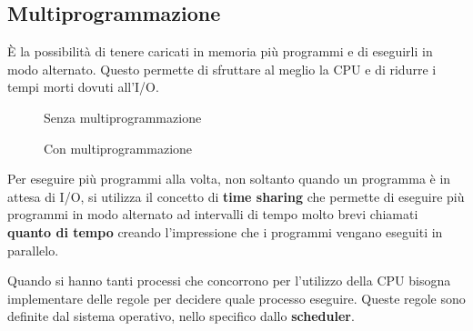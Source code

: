\documentclass[a4paper]{article}
\begin{document}
\subsection{Multiprogrammazione}
È la possibilità di tenere caricati in memoria più programmi e di eseguirli in modo
alternato. Questo permette di sfruttare al meglio la CPU e di ridurre i tempi morti
dovuti all'I/O.
\begin{figure}[H]
  \centering
  \caption{Senza multiprogrammazione}
\end{figure}
\begin{figure}[H]
  \centering
  \caption{Con multiprogrammazione}
\end{figure}
\noindent
Per eseguire più programmi alla volta, non soltanto quando un programma è in attesa
di I/O, si utilizza il concetto di \textbf{time sharing} che permette di eseguire
più programmi in modo alternato ad intervalli di tempo molto brevi chiamati \textbf{
quanto di tempo} creando l'impressione che i programmi vengano eseguiti in parallelo.

\vspace{1em}
\noindent
Quando si hanno tanti processi che concorrono per l'utilizzo della CPU bisogna implementare
delle regole per decidere quale processo eseguire. Queste regole sono definite dal
sistema operativo, nello specifico dallo \textbf{scheduler}.
\end{document}
